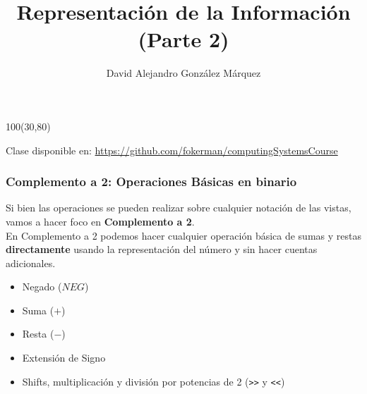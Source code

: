 \documentclass[aspectratio=169]{beamer}
\title{\Huge Representación de la Información\\ \Large (Parte 2)}
\author{David Alejandro González Márquez}
\date{}
\begin{document}
\begin{frame}[plain]
    \titlepage
    \begin{textblock}{100}(30,80)
    \begin{tcolorbox}[size=small,width=\textwidth,colback={gray!30},title={}]
    \begin{center}
     \scriptsize Clase disponible en: \url{https://github.com/fokerman/computingSystemsCourse}
    \end{center}
    \end{tcolorbox}
    \end{textblock}
\end{frame}

\begin{frame}[fragile]
    \frametitle{\textbf{Complemento a 2}: Operaciones Básicas en binario}
    Si bien las operaciones se pueden realizar sobre cualquier notación de las vistas,\\ vamos a hacer foco en \textbf{Complemento a 2}.\\
    \bigskip
    En Complemento a 2 podemos hacer cualquier operación básica de sumas y restas \textbf{directamente} usando la representación del número y sin hacer cuentas adicionales.\\
    \bigskip
    \begin{itemize}
     \item Negado ($NEG$)
     \item Suma ($+$)
     \item Resta ($-$)
     \item Extensión de Signo
     \item Shifts, multiplicación y división por potencias de 2 (\verb|>>| y \verb|<<|)
    \end{itemize}
\end{frame}
\end{document}
